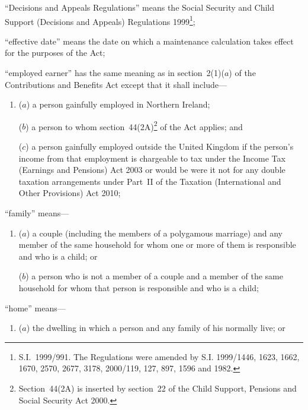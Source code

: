 \documentclass[12pt,a4paper]{article}
\begin{document}
\begin{enumerate}
“Decisions and Appeals Regulations” means the Social Security and Child Support (Decisions and Appeals) Regulations 1999\footnote{S.I.~1999/991. The Regulations were amended by S.I. 1999/1446, 1623, 1662, 1670, 2570, 2677, 3178, 2000/119, 127, 897, 1596 and 1982.};


“effective date” means the date on which a maintenance calculation takes effect for the purposes of the Act;

“employed earner” has the same meaning as in section~2(1)($a$)  of the Contributions and Benefits Act except that it shall include—
\begin{enumerate}\item[]
($a$) 
a person gainfully employed in Northern Ireland; 

\pagebreak
($b$) 
a person to whom section~44(2A)\footnote{Section~44(2A) is inserted by section~22 of the Child Support, Pensions and Social Security Act 2000.} of the Act applies;
and %

($c$) a person gainfully employed outside the United Kingdom if the person’s income from that employment is chargeable to tax under the Income Tax (Earnings and Pensions) Act 2003 or would be were it not for any double taxation arrangements under Part~II of the Taxation (International and Other Provisions) Act 2010;
\end{enumerate}

“family” means—
\begin{enumerate}\item[]
($a$) 
a couple (including the members of a polygamous marriage) and any member of the same household for whom one or more of them is responsible and who is a child; or

($b$) 
a person who is not a member of a couple and a member of the same household for whom that person is responsible and who is a child;
\end{enumerate}

“home” means—
\begin{enumerate}\item[]
($a$) 
the dwelling in which a person and any family of his normally live; or


\end{enumerate}
\end{enumerate}
\end{document}
